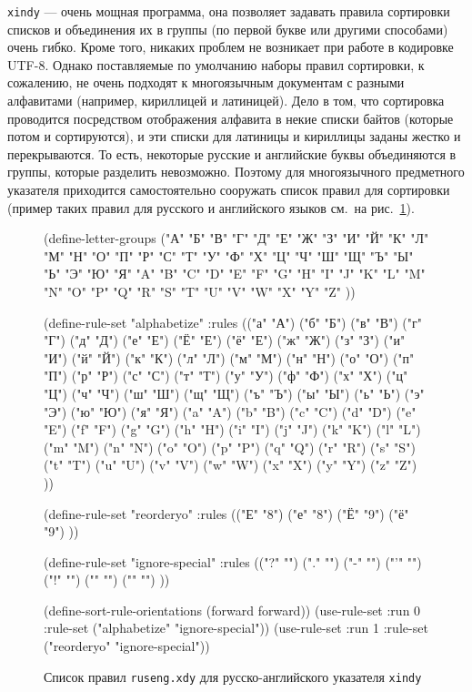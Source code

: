 \documentclass[a4paper,12pt]{article}
\newcommand\exe[1]{\texttt{#1}}
\newcommand\file[1]{\texttt{#1}}
\begin{document}
\exe{xindy} --- очень мощная программа, она позволяет задавать правила
сортировки списков и объединения их в группы (по первой букве или другими
способами) очень гибко. Кроме того, никаких проблем не возникает при работе
в кодировке UTF-8. Однако поставляемые по умолчанию наборы правил
сортировки, к сожалению, не очень подходят к многоязычным документам
с разными алфавитами (например, кириллицей и латиницей). Дело в том, что
сортировка проводится посредством отображения алфавита в некие списки
байтов (которые потом и сортируются), и эти списки для латиницы и кириллицы
заданы жестко и перекрываются. То есть, некоторые русские и английские буквы
объединяются в группы, которые разделить невозможно. Поэтому для многоязычного
предметного указателя приходится самостоятельно сооружать список правил для
сортировки (пример таких правил для русского и английского языков см.\ на
рис.~\ref{xindy1}).
\begin{figure}[tp]
\begin{xindycode}
(define-letter-groups ("А" "Б" "В" "Г" "Д" "Е" "Ж" "З" "И" "Й" "К"
    "Л" "М" "Н" "О" "П" "Р" "С" "Т" "У" "Ф" "Х" "Ц" "Ч" "Ш" "Щ" "Ъ"
    "Ы" "Ь" "Э" "Ю" "Я" "A" "B" "C" "D" "E" "F" "G" "H" "I" "J" "K"
    "L" "M" "N" "O" "P" "Q" "R" "S" "T" "U" "V" "W" "X" "Y" "Z"
    ))

(define-rule-set "alphabetize"
  :rules (("а" "А") ("б" "Б") ("в" "В") ("г" "Г") ("д" "Д") ("е" "Е")
          ("Ё" "Е") ("ё" "Е") ("ж" "Ж") ("з" "З") ("и" "И") ("й" "Й")
          ("к" "К") ("л" "Л") ("м" "М") ("н" "Н") ("о" "О") ("п" "П")
          ("р" "Р") ("с" "С") ("т" "Т") ("у" "У") ("ф" "Ф") ("х" "Х")
          ("ц" "Ц") ("ч" "Ч") ("ш" "Ш") ("щ" "Щ") ("ъ" "Ъ") ("ы" "Ы")
          ("ь" "Ь") ("э" "Э") ("ю" "Ю") ("я" "Я") ("a" "A") ("b" "B")
          ("c" "C") ("d" "D") ("e" "E") ("f" "F") ("g" "G") ("h" "H")
          ("i" "I") ("j" "J") ("k" "K") ("l" "L") ("m" "M") ("n" "N")
          ("o" "O") ("p" "P") ("q" "Q") ("r" "R") ("s" "S") ("t" "T")
          ("u" "U") ("v" "V") ("w" "W") ("x" "X") ("y" "Y") ("z" "Z")
          ))

(define-rule-set "reorderyo"
  :rules (("Е" "8") ("е" "8") ("Ё" "9") ("ё" "9")
	  ))

(define-rule-set "ignore-special"
  :rules (("?" "") ("." "") ("-" "") ("'" "") ("!" "") ("{" "") ("}" "")
          ))

(define-sort-rule-orientations (forward forward))
(use-rule-set :run 0
	      :rule-set ("alphabetize" "ignore-special"))
(use-rule-set :run 1
	      :rule-set ("reorderyo" "ignore-special"))
\end{xindycode}
\caption{Список правил \file{ruseng.xdy} для русско-английского указателя
\exe{xindy}}\label{xindy1}
\end{figure}
\end{document}
